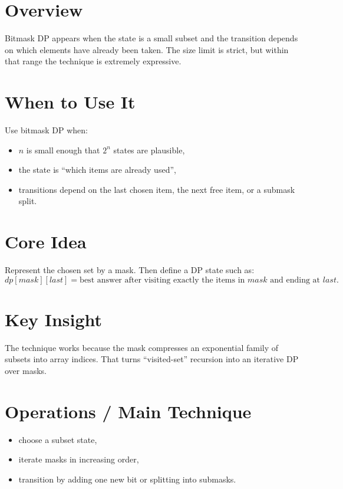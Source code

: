 \section*{Overview}

Bitmask DP appears when the state is a small subset and the transition depends on which elements have already been
taken. The size limit is strict, but within that range the technique is extremely expressive.

\section*{When to Use It}

Use bitmask DP when:

\begin{itemize}
  \item \(n\) is small enough that \(2^n\) states are plausible,
  \item the state is ``which items are already used'',
  \item transitions depend on the last chosen item, the next free item, or a submask split.
\end{itemize}

\section*{Core Idea}

Represent the chosen set by a mask. Then define a DP state such as:
\[
dp[mask][last] = \text{best answer after visiting exactly the items in } mask \text{ and ending at } last.
\]

\section*{Key Insight}

The technique works because the mask compresses an exponential family of subsets into array indices. That turns
``visited-set'' recursion into an iterative DP over masks.

\section*{Operations / Main Technique}

\begin{itemize}
  \item choose a subset state,
  \item iterate masks in increasing order,
  \item transition by adding one new bit or splitting into submasks.
\end{itemize}


